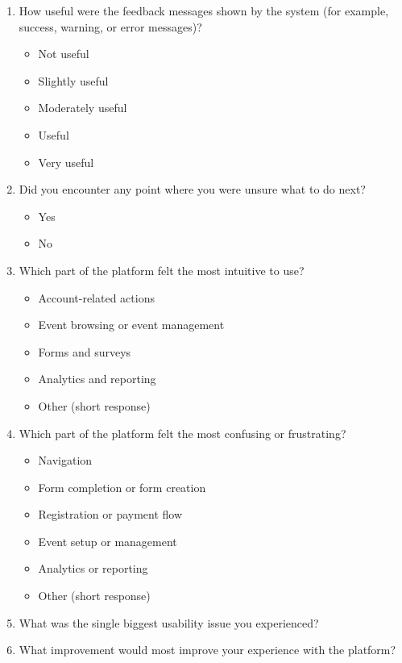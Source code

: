 \documentclass[12pt]{article}
\begin{document}
\begin{enumerate}
    \begin{itemize}[label=$\circ$]
        \item Very poor
        \item Poor
        \item Acceptable
        \item Good
        \item Excellent
    \end{itemize}
    \item How useful were the feedback messages shown by the system (for example, success, warning, or error messages)?
    \begin{itemize}[label=$\circ$]
        \item Not useful
        \item Slightly useful
        \item Moderately useful
        \item Useful
        \item Very useful
    \end{itemize}
    \item Did you encounter any point where you were unsure what to do next?
    \begin{itemize}[label=$\circ$]
        \item Yes
        \item No
    \end{itemize}
    \item Which part of the platform felt the most intuitive to use?
    \begin{itemize}[label=$\square$]
        \item Account-related actions
        \item Event browsing or event management
        \item Forms and surveys
        \item Analytics and reporting
        \item Other (short response)
    \end{itemize}
    \item Which part of the platform felt the most confusing or frustrating?
    \begin{itemize}[label=$\circ$]
        \item Navigation
        \item Form completion or form creation
        \item Registration or payment flow
        \item Event setup or management
        \item Analytics or reporting
        \item Other (short response)
    \end{itemize}
    \item What was the single biggest usability issue you experienced?\\
    \underline{\hspace{15cm}}
    \item What improvement would most improve your experience with the platform?\\
    \underline{\hspace{15cm}}
\end{enumerate}
\end{document}
